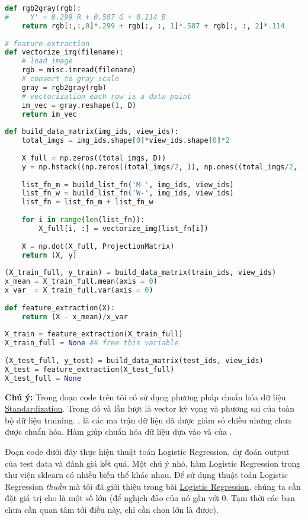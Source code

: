 \begin{lstlisting}[language=Python]
def rgb2gray(rgb): 
#     Y' = 0.299 R + 0.587 G + 0.114 B  
    return rgb[:,:,0]*.299 + rgb[:, :, 1]*.587 + rgb[:, :, 2]*.114 
 
# feature extraction  
def vectorize_img(filename):     
    # load image  
    rgb = misc.imread(filename) 
    # convert to gray scale  
    gray = rgb2gray(rgb) 
    # vectorization each row is a data point  
    im_vec = gray.reshape(1, D) 
    return im_vec  
 
def build_data_matrix(img_ids, view_ids): 
    total_imgs = img_ids.shape[0]*view_ids.shape[0]*2  
         
    X_full = np.zeros((total_imgs, D)) 
    y = np.hstack((np.zeros((total_imgs/2, )), np.ones((total_imgs/2, )))) 
     
    list_fn_m = build_list_fn('M-', img_ids, view_ids) 
    list_fn_w = build_list_fn('W-', img_ids, view_ids) 
    list_fn = list_fn_m + list_fn_w  
     
    for i in range(len(list_fn)): 
        X_full[i, :] = vectorize_img(list_fn[i]) 
 
    X = np.dot(X_full, ProjectionMatrix) 
    return (X, y) 
 
(X_train_full, y_train) = build_data_matrix(train_ids, view_ids) 
x_mean = X_train_full.mean(axis = 0) 
x_var  = X_train_full.var(axis = 0) 
 
def feature_extraction(X): 
    return (X - x_mean)/x_var      
 
X_train = feature_extraction(X_train_full) 
X_train_full = None ## free this variable  
 
(X_test_full, y_test) = build_data_matrix(test_ids, view_ids) 
X_test = feature_extraction(X_test_full) 
X_test_full = None  
\end{lstlisting}
 
\textbf{Chú ý:} Trong đoạn code trên tôi có sử dụng phương pháp chuẩn hóa dữ liệu \href{http://machinelearningcoban.com/general/2017/02/06/featureengineering/#standardization}{Standardization}. Trong đó  và  lần lượt là vector kỳ vọng và phương sai của toàn bộ dữ liệu training. ,  là các ma trận dữ liệu đã được giảm số chiều nhưng chưa được chuẩn hóa. Hàm  giúp chuẩn hóa dữ liệu dựa vào  và  của . 
 
Đoạn code dưới đây thực hiện thuật toán Logistic Regression, dự đoán output của test data và đánh giá kết quả. Một chú ý nhỏ, hàm Logistic Regression trong thư viện sklearn có nhiều biến thể khác nhau. Để sử dụng thuật toán Logistic Regression \textit{thuần} mà tôi đã giới thiệu trong bài \href{http://machinelearningcoban.com/2017/01/27/logisticregression/}{Logistic Regression}, chúng ta cần đặt giá trị cho  là một số lớn (để nghịch đảo của nó gần với 0. Tạm thời các bạn chưa cần quan tâm tới điều này, chỉ cần chọn  lớn là được). 
 
